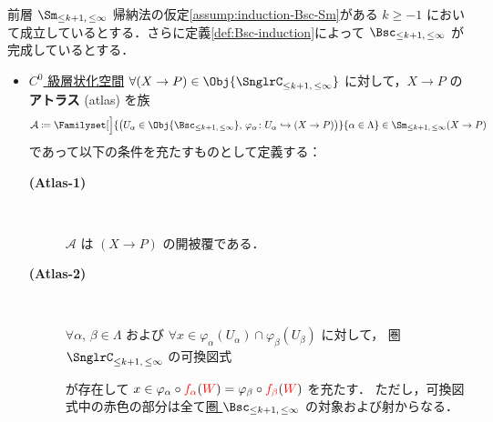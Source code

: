 \documentclass[TQFT_main]{subfiles}
\begin{document}
\begin{mydef}[label=def:Sm-induction,breakable]{前層 $\Sm_{\le k+1,\, \le \infty}$}
    帰納法の仮定\ref{assump:induction-Bsc-Sm}がある $k \ge -1$ において成立しているとする．さらに定義\ref{def:Bsc-induction}によって $\Bsc_{\le k+1,\, \le \infty}$ が完成しているとする．
    \begin{itemize}
        \item \hyperref[def:Snglr-C0]{$C^0$ 級層状化空間} $\forall (X \to P) \in \Obj{\SnglrC_{\le k+1,\, \le \infty}}$ に対して，$X \to P$ の\textbf{アトラス} (atlas) を族
        \begin{align}
            \mathcal{A} \coloneqq \Familyset[\Big]{\bigl(U_\alpha \in \Obj{\Bsc_{\le k+1,\, \le \infty}},\, \varphi_\alpha \colon U_\alpha \hookrightarrow (X \to P)\bigr)}{\alpha \in \Lambda} \in \Sm_{\le k+1,\, \le \infty} (X \to P)
        \end{align}
        であって以下の条件を充たすものとして定義する：
        \begin{description}
            \item[\textbf{(Atlas-1)}]　
            
            $\mathcal{A}$ は $(X \to P)$ の開被覆である．
    
            \item[\textbf{(Atlas-2)}]　
            
            $\forall \alpha,\, \beta \in \Lambda$ および $\forall x \in \varphi_\alpha (U_\alpha) \cap \varphi_\beta (U_\beta)$ に対して，
            圏 $\SnglrC_{\le k+1,\, \le \infty}$ の可換図式
            \begin{center}
            \end{center}
            が存在して $x \in \varphi_\alpha \circ \textcolor{red}{f_\alpha} (\textcolor{red}{W}) = \varphi_\beta \circ \textcolor{red}{f_\beta} (\textcolor{red}{W})$ を充たす．
            ただし，可換図式中の赤色の部分は全て\hyperref[def:Bsc-induction]{圏 $\Bsc_{\le k+1,\, \le \infty}$} の対象および射からなる．


\end{description}
\end{itemize}
\end{mydef}
\end{document}
